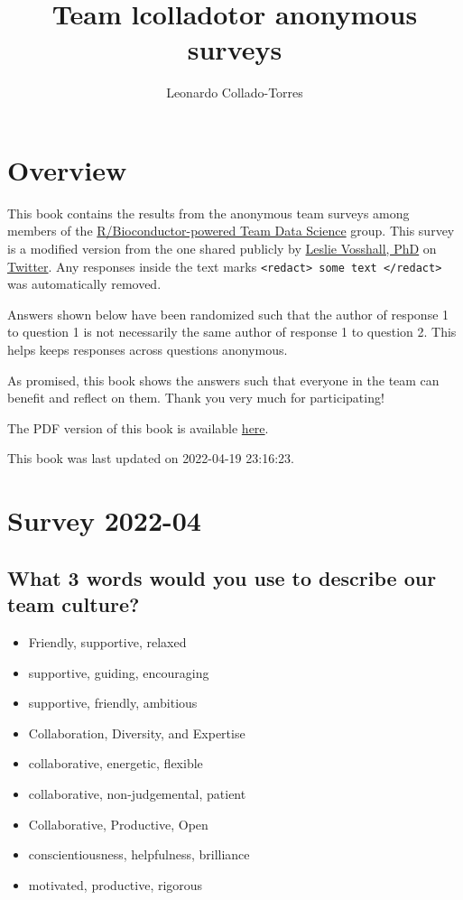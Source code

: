 \documentclass[
]{book}
\title{Team lcolladotor anonymous surveys}
\author{Leonardo Collado-Torres}
\date{}
\providecommand{\tightlist}{%
  \setlength{\itemsep}{0pt}\setlength{\parskip}{0pt}}
\begin{document}
\maketitle

{
\setcounter{tocdepth}{1}
\tableofcontents
}
\hypertarget{overview}{%
\chapter*{Overview}\label{overview}}

This book contains the results from the anonymous team surveys among members of the \href{https://lcolladotor.github.io/bioc_team_ds/}{R/Bioconductor-powered Team Data Science} group. This survey is a modified version from the one shared publicly by \href{https://twitter.com/leslievosshall}{Leslie Vosshall, PhD} on \href{https://twitter.com/leslievosshall/status/1371260850657460227?s=20}{Twitter}. Any responses inside the text marks \texttt{\textless{}redact\textgreater{}\ some\ text\ \textless{}/redact\textgreater{}} was automatically removed.

Answers shown below have been randomized such that the author of response 1 to question 1 is not necessarily the same author of response 1 to question 2. This helps keeps responses across questions anonymous.

As promised, this book shows the answers such that everyone in the team can benefit and reflect on them. Thank you very much for participating!

The PDF version of this book is available \href{_main.pdf}{here}.

This book was last updated on 2022-04-19 23:16:23.

\hypertarget{survey-2022-04}{%
\chapter{Survey 2022-04}\label{survey-2022-04}}

\hypertarget{what-3-words-would-you-use-to-describe-our-team-culture}{%
\section{What 3 words would you use to describe our team culture?}\label{what-3-words-would-you-use-to-describe-our-team-culture}}

\begin{itemize}
\tightlist
\item
  Friendly, supportive, relaxed
\item
  supportive, guiding, encouraging
\item
  supportive, friendly, ambitious
\item
  Collaboration, Diversity, and Expertise
\item
  collaborative, energetic, flexible
\item
  collaborative, non-judgemental, patient
\item
  Collaborative, Productive, Open
\item
  conscientiousness, helpfulness, brilliance
\item
  motivated, productive, rigorous
\end{itemize}
\end{document}
